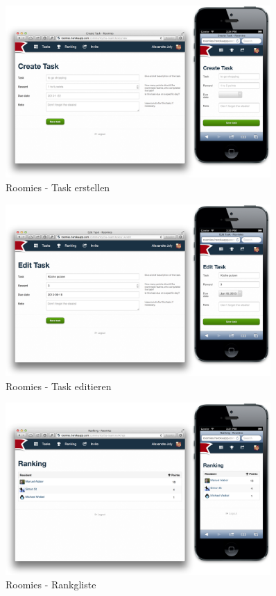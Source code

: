 \begin{figure}[H]
	\centering
	\includegraphics[width=0.9\textwidth]{content/appendix/roomies-screenshots/create_task.png}
	\caption{Roomies - Task erstellen}
	\label{fig:roomies-ss-create-task}
\end{figure}

\begin{figure}[H]
	\centering
	\includegraphics[width=0.9\textwidth]{content/appendix/roomies-screenshots/edit_task.png}
	\caption{Roomies - Task editieren}
	\label{fig:roomies-ss-edit-task}
\end{figure}

\begin{figure}[H]
	\centering
	\includegraphics[width=0.9\textwidth]{content/appendix/roomies-screenshots/ranking.png}
	\caption{Roomies - Rankgliste}
	\label{fig:roomies-ss-ranking}
\end{figure}

